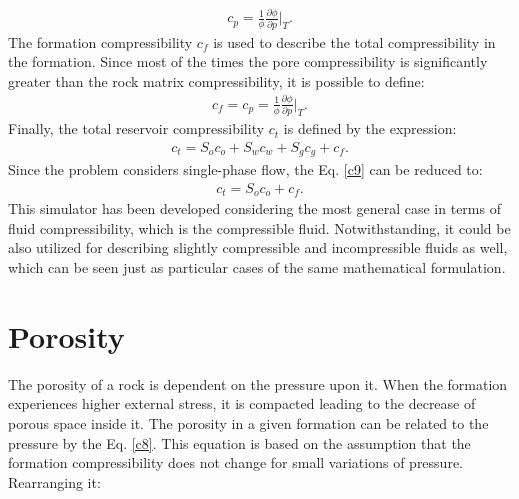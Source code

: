 	\begin{align}
	\label{c7}
	c_p=\frac{1}{\phi} \frac{\partial \phi}{\partial p} \bigg|_T .
	\end{align}
The formation compressibility $c_f$ is used to describe the total compressibility in the formation. Since most of the times the pore compressibility is significantly greater than the rock matrix compressibility, it is possible to define:
	\begin{align}
	\label{c8}
	c_f= c_p= \frac{1}{\phi} \frac{\partial \phi}{\partial p} \bigg|_T .
	\end{align}
Finally, the total reservoir compressibility $c_t$ is defined by the expression:
	 \begin{align}
	 \label{c9}
	 c_t= S_o c_o + S_w c_w + S_g c_g + c_f .
	 \end{align}
Since the problem considers single-phase flow, the Eq. \ref{c9} can be reduced to:
	\begin{align}
	\label{c10}
	c_t= S_o c_o + c_f .
	\end{align}
 This simulator has been developed considering the most general case in terms of fluid compressibility, which is the compressible fluid. Notwithstanding, it could be also utilized for describing slightly compressible and incompressible fluids as well, which can be seen just as particular cases of the same mathematical formulation.

\section{Porosity}

The porosity of a rock is dependent on the pressure upon it. When the formation experiences higher external stress, it is compacted leading to the decrease of porous space inside it. The porosity in a given formation can be related to the pressure by the Eq. \ref{c8}. This equation is based on the assumption that the formation compressibility does not change for small variations of pressure. Rearranging it:


